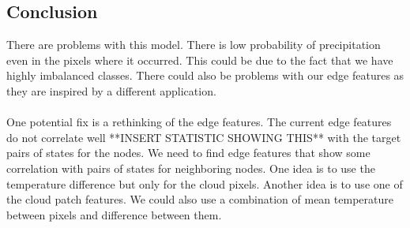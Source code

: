 \subsection{Conclusion}

There are problems with this model. There is low probability of precipitation even in the pixels where it occurred. This could be due to the fact that we have highly imbalanced classes. There could also be problems with our edge features as they are inspired by a different application. \\
\\
One potential fix is a rethinking of the edge features. The current edge features do not correlate well **INSERT STATISTIC SHOWING THIS** with the target pairs of states for the nodes. We need to find edge features that show some correlation with pairs of states for neighboring nodes. One idea is to use the temperature difference but only for the cloud pixels. Another idea is to use one of the cloud patch features. We could also use a combination of mean temperature between pixels and difference between them. 


